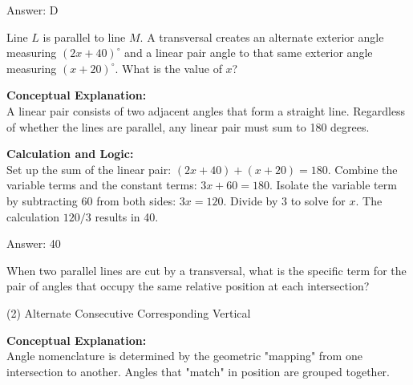 \documentclass[11pt,paper=a4,answers]{exam}
\begin{document}
\begin{questions}
\begin{solution}
Answer: \colorbox{yellow!100}{D}
\end{solution}

\vspace{60pt}

\question
Line $L$ is parallel to line $M$. A transversal creates an alternate exterior angle measuring $(2x + 40)^\circ$ and a linear pair angle to that same exterior angle measuring $(x + 20)^\circ$. What is the value of $x$?

\begin{solution}
\textbf{Conceptual Explanation:} \\
A linear pair consists of two adjacent angles that form a straight line. Regardless of whether the lines are parallel, any linear pair must sum to 180 degrees.

\vspace{30pt}

\textbf{Calculation and Logic:} \\
Set up the sum of the linear pair: $(2x + 40) + (x + 20) = 180$. Combine the variable terms and the constant terms: $3x + 60 = 180$. Isolate the variable term by subtracting 60 from both sides: $3x = 120$. Divide by 3 to solve for $x$. The calculation $120 / 3$ results in 40.

\vspace{30pt}

Answer: \colorbox{yellow!100}{40}
\end{solution}

\vspace{60pt}

\question
When two parallel lines are cut by a transversal, what is the specific term for the pair of angles that occupy the same relative position at each intersection?
\begin{tasks}(2)
    \task Alternate
    \task Consecutive
    \task Corresponding
    \task Vertical
\end{tasks}

\begin{solution}
\textbf{Conceptual Explanation:} \\
Angle nomenclature is determined by the geometric "mapping" from one intersection to another. Angles that "match" in position are grouped together.

\vspace{30pt}


\end{solution}
\end{questions}
\end{document}
